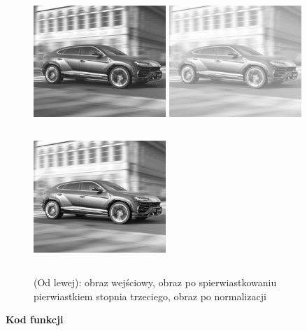 \documentclass[magisterska,openany]{pracadypl}
\begin{document}
\begin{figure}[h]
\centering
\includegraphics[width=5cm, height=5cm]{orgi/gLU.jpg}
\includegraphics[width=5cm, height=5cm]{3_9/rootG2.jpg}
\includegraphics[width=5cm, height=5cm]{3_9/nrootG2.jpg}
\caption{(Od lewej): obraz wejściowy, obraz po spierwiastkowaniu pierwiastkiem stopnia trzeciego, obraz po normalizacji}
\end{figure}

\newpage
\textbf{\Large Kod funkcji}
   
\end{document}
